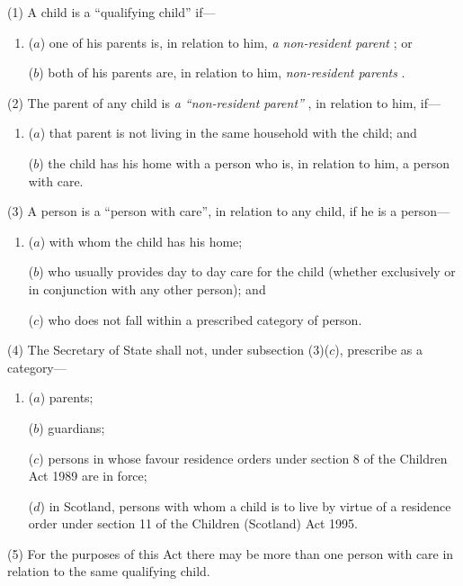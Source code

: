 \documentclass[12pt,a4paper]{article}
\begin{document}
(1) A child is a “qualifying child” if—
\begin{enumerate}\item[]
($a$) one of his parents is, in relation to him, 
\emph{a non-resident parent}%
; or

($b$) both of his parents are, in relation to him, 
\emph{non-resident parents}%
.
\end{enumerate}

(2) The parent of any child is 
\emph{a ``non-resident parent''}%
, in relation to him, if—
\begin{enumerate}\item[]
($a$) that parent is not living in the same household with the child; and

($b$) the child has his home with a person who is, in relation to him, a person with care.
\end{enumerate}

(3) A person is a “person with care”, in relation to any child, if he is a person—
\begin{enumerate}\item[]
($a$) with whom the child has his home;

($b$) who usually provides day to day care for the child (whether exclusively or in conjunction with any other person); and

($c$) who does not fall within a prescribed category of person.
\end{enumerate}

(4) The Secretary of State shall not, under subsection (3)($c$), prescribe as a category—
\begin{enumerate}\item[]
($a$) parents;

($b$) guardians;

($c$) persons in whose favour residence orders under section 8 of the Children Act 1989 are in force;

($d$) in Scotland, persons 
with whom a child is to live by virtue of a residence order under section 11 of the Children (Scotland) Act 1995.  %
\end{enumerate}

(5) For the purposes of this Act there may be more than one person with care in relation to the same qualifying child.
\end{document}

